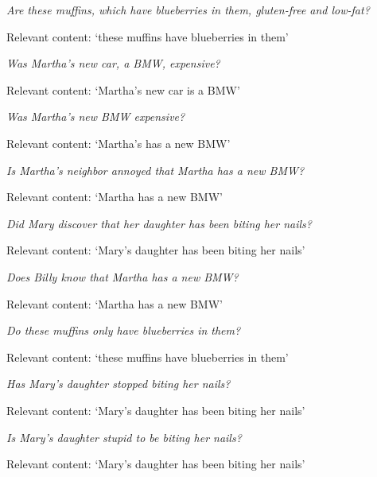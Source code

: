 \documentclass[11pt,fleqn]{article}
\newcommand{\6}{\mbox{$[\hspace*{-.6mm}[$}}
\newcommand{\9}{\mbox{$]\hspace*{-.6mm}]$}}
\begin{document}
\begin{exe}
\ex\label{examples-1a}
\begin{xlist}

{\em Are these muffins, which have blueberries in them, gluten-free and low-fat?}

Relevant content: `these muffins have blueberries in them'


{\em Was Martha's new car, a BMW, expensive?}

Relevant content: `Martha's new car is a BMW'


{\em Was Martha's new BMW expensive?}

Relevant content: `Martha's has a new BMW'


{\em Is Martha's neighbor annoyed that Martha has a new BMW?}

Relevant content: `Martha has a new BMW'


{\em Did Mary discover that her daughter has been biting her nails?}

Relevant content: `Mary's daughter has been biting her nails'


{\em Does Billy know that Martha has a new BMW?}

Relevant content: `Martha has a new BMW'


{\em Do these muffins only have blueberries in them?}

Relevant content: `these muffins have blueberries in them'


{\em Has Mary's daughter stopped biting her nails?}
    
Relevant content: `Mary's daughter has been biting her nails'


{\em Is Mary's daughter stupid to be biting her nails?}

Relevant content: `Mary's daughter has been biting her nails'

\end{xlist}
\end{exe}
\end{document}
